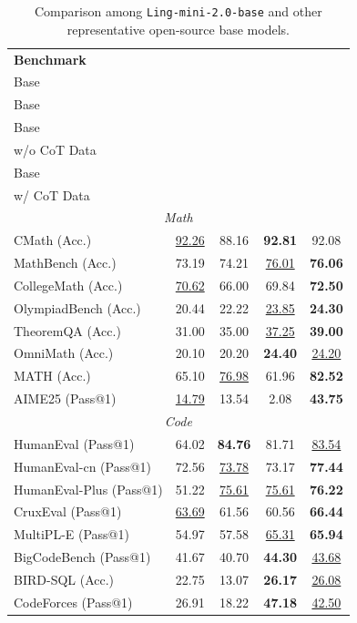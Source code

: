 \documentclass[table]{gtech}
\newcommand{\splitcell}[2][c]{\makecell[#1]{#2}}
\theoremstyle{definition}
\begin{document}
\begin{table}[h]
\centering
\caption{{Comparison among \texttt{Ling-mini-2.0-base} and other representative open-source base models. }}
\label{tab:mini-base-benchmarks}
\small
{
\begin{tabular}{lcccc}
\toprule
\textbf{Benchmark} & \textbf{\splitcell{Hunyuan-7B \\ Base}}  & 
\textbf{\splitcell{Qwen3-8B \\ Base}}  & \textbf{\splitcell{\texttt{Ling-mini-2.0} \\ Base \\ w/o CoT Data}} & \textbf{\splitcell{\texttt{Ling-mini-2.0} \\ Base \\ w/ CoT Data}} \\
\midrule
\multicolumn{5}{c}{\textit{Math}} \\
\midrule
CMath (Acc.) & \underline{92.26} & 88.16 & \textbf{92.81} & 92.08\\
MathBench (Acc.) & 73.19 & 74.21 & \underline{76.01} & \textbf{76.06} \\
CollegeMath (Acc.) & \underline{70.62} & 66.00 & 69.84 & \textbf{72.50}\\
OlympiadBench (Acc.) & 20.44 & 22.22 & \underline{23.85} & \textbf{24.30}\\
TheoremQA (Acc.) & 31.00 & 35.00 & \underline{37.25} & \textbf{39.00}\\
OmniMath (Acc.) & 20.10 & 20.20 & \textbf{24.40} & \underline{24.20}\\
MATH (Acc.) & 65.10 & \underline{76.98} & 61.96 & \textbf{82.52}\\
AIME25 (Pass@1) & \underline{14.79} & 13.54 & 2.08 & \textbf{43.75} \\
\midrule
\multicolumn{5}{c}{\textit{Code}} \\
\midrule
HumanEval (Pass@1) & 64.02 & \textbf{84.76} & 81.71 & \underline{83.54} \\
HumanEval-cn (Pass@1) & 72.56 & \underline{73.78} & 73.17 & \textbf{77.44} \\
HumanEval-Plus (Pass@1) & 51.22 & \underline{75.61} & \underline{75.61} & \textbf{76.22}\\
CruxEval (Pass@1) & \underline{63.69} & 61.56 & 60.56 & \textbf{66.44} \\
MultiPL-E (Pass@1) & 54.97 & 57.58 & \underline{65.31} & \textbf{65.94}\\

BigCodeBench (Pass@1) & 41.67 & 40.70 & \textbf{44.30} & \underline{43.68} \\
BIRD-SQL (Acc.) & 22.75 & 13.07 & \textbf{26.17} & \underline{26.08} \\
CodeForces (Pass@1) & 26.91 & 18.22 & \textbf{47.18} & \underline{42.50} \\


\end{tabular}}
\end{table}
\end{document}
